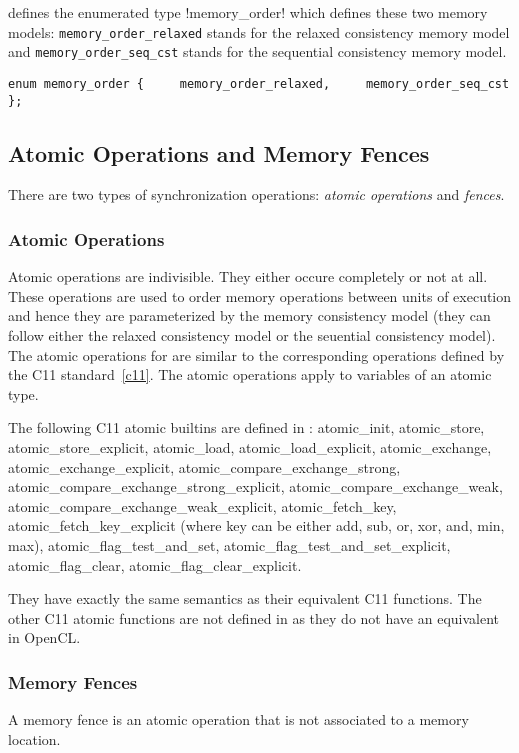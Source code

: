 \pencil defines the enumerated type \lstlisting!memory_order!
which defines these two memory models:
\lstinline!memory_order_relaxed! stands for the relaxed consistency memory
model and \lstinline!memory_order_seq_cst! stands for the sequential
consistency memory model.

\lstinline!enum memory_order {
    memory_order_relaxed,
    memory_order_seq_cst
};!

\subsection{Atomic Operations and Memory Fences}

There are two types of synchronization operations: \emph{atomic operations} and
\emph{fences}.

\subsubsection{Atomic Operations}
Atomic operations are indivisible. They either occure completely or not at all.
These operations are used to order memory operations between units of execution
and hence they are parameterized by the \pencil memory consistency model
(they can follow either the relaxed consistency model or the seuential
consistency model).
The atomic operations for \pencil are similar to the corresponding operations
defined by the C11 standard~\ref{c11}.
The \pencil atomic operations apply to variables of an atomic type.

The following C11 atomic builtins are defined in \pencil:
atomic_init, atomic_store, atomic_store_explicit, atomic_load,
atomic_load_explicit, atomic_exchange, 	atomic_exchange_explicit,
atomic_compare_exchange_strong, atomic_compare_exchange_strong_explicit,
atomic_compare_exchange_weak, atomic_compare_exchange_weak_explicit,
atomic_fetch_key, atomic_fetch_key_explicit (where key can be either
add, sub, or, xor, and, min, max),
atomic_flag_test_and_set, atomic_flag_test_and_set_explicit,
atomic_flag_clear, atomic_flag_clear_explicit.

They have exactly the same semantics as their equivalent C11 functions.
The other C11 atomic functions are not defined in \pencil as they do not have
an equivalent in OpenCL.

\subsubsection{Memory Fences}
A memory fence is an atomic operation that is not associated to a memory
location.

